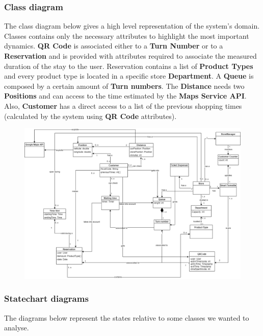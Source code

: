 \documentclass{article}
\begin{document}
\subsubsection{Class diagram}
The class diagram below gives a high level representation of the system's domain. Classes contains only the necessary attributes to highlight the most important dynamics. \textbf{QR Code} is associated either to a \textbf{Turn Number} or to a \textbf{Reservation} and is provided with attributes required to associate the measured duration of the stay to the user. Reservation contains a list of \textbf{Product Types} and every product type is located in a specific store \textbf{Department}. A \textbf{Queue} is composed by a certain amount of \textbf{Turn numbers}. The \textbf{Distance} needs two \textbf{Positions} and can access to the time estimated by the \textbf{Maps Service API}. Also, \textbf{Customer} has a direct access to a list of the previous shopping times (calculated by the system using \textbf{QR Code} attributes).\newline\newline\newline\newline
\begin{figure}[H]
  \includegraphics[width=\linewidth]{class_diagram.png}
  
\end{figure}

\newpage
\subsubsection{Statechart diagrams}

The diagrams below represent the states relative to some classes we wanted to analyse.
\end{document}
